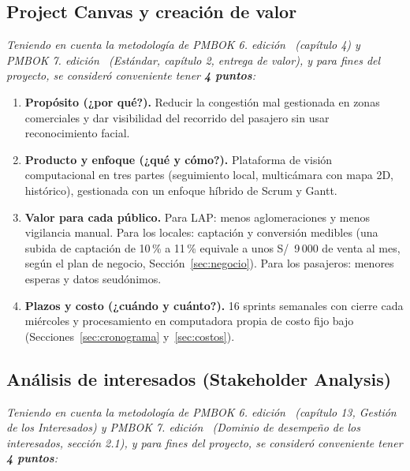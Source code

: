 \documentclass[12pt,a4paper]{article}
\begin{document}
\subsection{Project Canvas y creación de valor}
\label{sec:canvas}

\textit{Teniendo en cuenta la metodología de PMBOK 6.\textordfeminine{} edición~\cite{pmbok6}
(capítulo 4) y PMBOK 7.\textordfeminine{} edición~\cite{pmbok7} (Estándar, capítulo 2, entrega
de valor), y para fines del proyecto, se consideró conveniente tener
\textbf{4 puntos}:}

\begin{enumerate}
    \item \textbf{Propósito (¿por qué?).} Reducir la congestión mal gestionada
    en zonas comerciales y dar visibilidad del recorrido del pasajero sin usar
    reconocimiento facial.

    \item \textbf{Producto y enfoque (¿qué y cómo?).} Plataforma de visión
    computacional en tres partes (seguimiento local, multicámara con mapa 2D,
    histórico), gestionada con un enfoque híbrido de Scrum y Gantt.

    \item \textbf{Valor para cada público.} Para LAP: menos aglomeraciones y
    menos vigilancia manual. Para los locales: captación y conversión
    medibles (una subida de captación de 10\,\% a 11\,\% equivale a unos
    S/~9\,000 de venta al mes, según el plan de negocio,
    Sección~\ref{sec:negocio}). Para los pasajeros: menores esperas y datos
    seudónimos.

    \item \textbf{Plazos y costo (¿cuándo y cuánto?).} 16 sprints semanales con
    cierre cada miércoles y procesamiento en computadora propia de costo fijo
    bajo (Secciones~\ref{sec:cronograma} y~\ref{sec:costos}).
\end{enumerate}

\subsection{Análisis de interesados (Stakeholder Analysis)}
\label{sec:interesados}

\textit{Teniendo en cuenta la metodología de PMBOK 6.\textordfeminine{} edición~\cite{pmbok6}
(capítulo 13, Gestión de los Interesados) y PMBOK 7.\textordfeminine{} edición~\cite{pmbok7}
(Dominio de desempeño de los interesados, sección 2.1), y para fines del
proyecto, se consideró conveniente tener \textbf{4 puntos}:}
\end{document}
